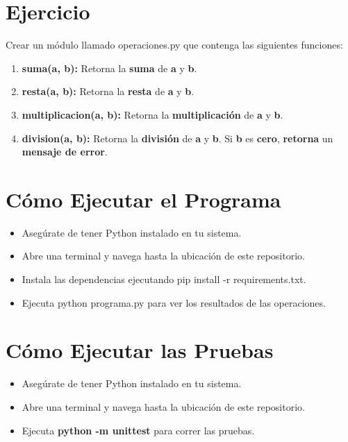 \documentclass[
  a4paper,
  DIV=11,
  numbers=noendperiod,
  onepage,
  openany]{scrreprt}
\providecommand{\tightlist}{%
  \setlength{\itemsep}{0pt}\setlength{\parskip}{0pt}}\usepackage{longtable,booktabs,array}
\begin{document}
\begin{tcolorbox}
\section{Ejercicio}\label{ejercicio}

Crear un módulo llamado operaciones.py que contenga las siguientes
funciones:

\begin{enumerate}
\def\labelenumi{\arabic{enumi}.}
\tightlist
\item
  \textbf{suma(a, b):} Retorna la \textbf{suma} de \textbf{a} y
  \textbf{b}.
\item
  \textbf{resta(a, b):} Retorna la \textbf{resta} de \textbf{a} y
  \textbf{b}.
\item
  \textbf{multiplicacion(a, b):} Retorna la \textbf{multiplicación} de
  \textbf{a} y \textbf{b}.
\item
  \textbf{division(a, b):} Retorna la \textbf{división} de \textbf{a} y
  \textbf{b}. Si \textbf{b} es \textbf{cero}, \textbf{retorna} un
  \textbf{mensaje de error}.
\end{enumerate}

\section{Cómo Ejecutar el Programa}\label{cuxf3mo-ejecutar-el-programa}

\begin{itemize}
\tightlist
\item
  Asegúrate de tener Python instalado en tu sistema.
\item
  Abre una terminal y navega hasta la ubicación de este repositorio.
\item
  Instala las dependencias ejecutando pip install -r requirements.txt.
\item
  Ejecuta python programa.py para ver los resultados de las operaciones.
\end{itemize}

\section{Cómo Ejecutar las
Pruebas}\label{cuxf3mo-ejecutar-las-pruebas-1}

\begin{itemize}
\tightlist
\item
  Asegúrate de tener Python instalado en tu sistema.
\item
  Abre una terminal y navega hasta la ubicación de este repositorio.
\item
  Ejecuta \textbf{python -m unittest} para correr las pruebas.
\end{itemize}


\end{tcolorbox}
\end{document}
